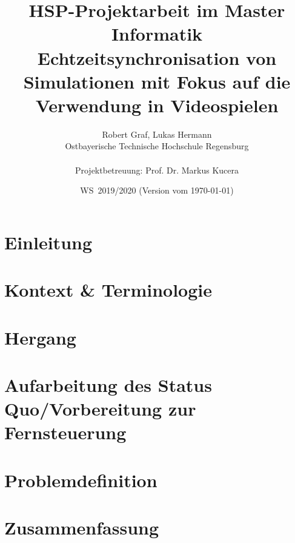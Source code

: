 \documentclass[11pt,twoside,a4paper]{article}
\begin{document}
\title{HSP-Projektarbeit im Master Informatik \\
\small Echtzeitsynchronisation von Simulationen mit Fokus auf die Verwendung in Videospielen}
\author{Robert Graf, Lukas Hermann\\
  Ostbayerische Technische Hochschule Regensburg\\
  \\
  Projektbetreuung: Prof. Dr. Markus Kucera
}
  
\date{WS\, 2019/2020 (Version vom \today)}

\maketitle

\newpage
\tableofcontents



\section{Einleitung}


\section{Kontext \& Terminologie}



\section{Hergang}


\section{Aufarbeitung des Status Quo/Vorbereitung zur Fernsteuerung}


\section{Problemdefinition}


\section{Zusammenfassung}

\end{document}
